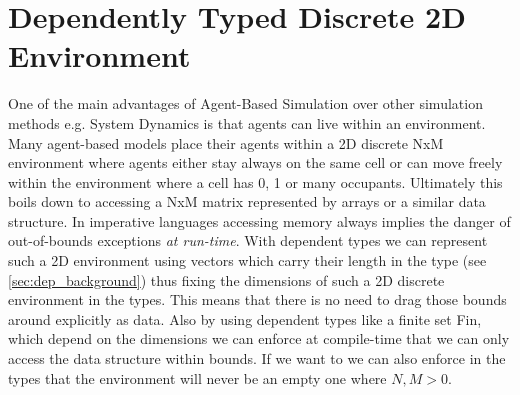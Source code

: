\section{Dependently Typed Discrete 2D Environment}
\label{sec:dep_abs_2denv}
One of the main advantages of Agent-Based Simulation over other simulation methods e.g. System Dynamics is that agents can live within an environment. Many agent-based models place their agents within a 2D discrete NxM environment where agents either stay always on the same cell or can move freely within the environment where a cell has 0, 1 or many occupants. Ultimately this boils down to accessing a NxM matrix represented by arrays or a similar data structure. In imperative languages accessing memory always implies the danger of out-of-bounds exceptions \textit{at run-time}. With dependent types we can represent such a 2D environment using vectors which carry their length in the type (see \ref{sec:dep_background}) thus fixing the dimensions of such a 2D discrete environment in the types. This means that there is no need to drag those bounds around explicitly as data. Also by using dependent types like a finite set Fin, which depend on the dimensions we can enforce at compile-time that we can only access the data structure within bounds. If we want to we can also enforce in the types that the environment will never be an empty one where $N, M > 0$.

